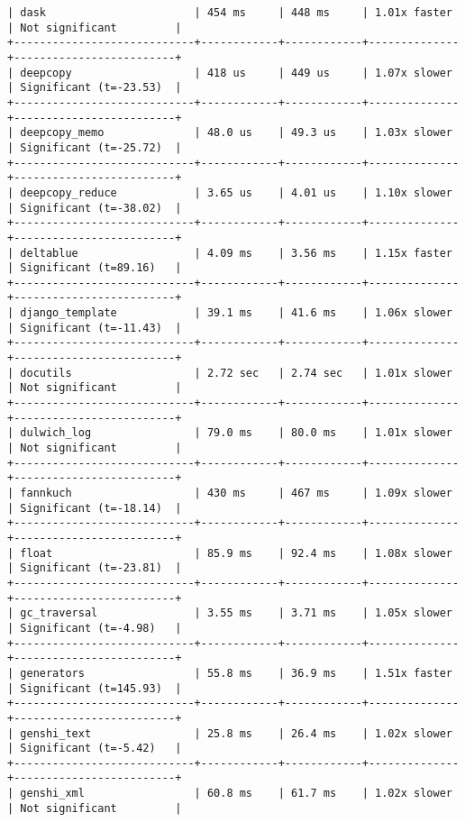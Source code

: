 \begin{code}
\begin{verbatim}
| dask                       | 454 ms     | 448 ms     | 1.01x faster | Not significant         |
+----------------------------+------------+------------+--------------+-------------------------+
| deepcopy                   | 418 us     | 449 us     | 1.07x slower | Significant (t=-23.53)  |
+----------------------------+------------+------------+--------------+-------------------------+
| deepcopy_memo              | 48.0 us    | 49.3 us    | 1.03x slower | Significant (t=-25.72)  |
+----------------------------+------------+------------+--------------+-------------------------+
| deepcopy_reduce            | 3.65 us    | 4.01 us    | 1.10x slower | Significant (t=-38.02)  |
+----------------------------+------------+------------+--------------+-------------------------+
| deltablue                  | 4.09 ms    | 3.56 ms    | 1.15x faster | Significant (t=89.16)   |
+----------------------------+------------+------------+--------------+-------------------------+
| django_template            | 39.1 ms    | 41.6 ms    | 1.06x slower | Significant (t=-11.43)  |
+----------------------------+------------+------------+--------------+-------------------------+
| docutils                   | 2.72 sec   | 2.74 sec   | 1.01x slower | Not significant         |
+----------------------------+------------+------------+--------------+-------------------------+
| dulwich_log                | 79.0 ms    | 80.0 ms    | 1.01x slower | Not significant         |
+----------------------------+------------+------------+--------------+-------------------------+
| fannkuch                   | 430 ms     | 467 ms     | 1.09x slower | Significant (t=-18.14)  |
+----------------------------+------------+------------+--------------+-------------------------+
| float                      | 85.9 ms    | 92.4 ms    | 1.08x slower | Significant (t=-23.81)  |
+----------------------------+------------+------------+--------------+-------------------------+
| gc_traversal               | 3.55 ms    | 3.71 ms    | 1.05x slower | Significant (t=-4.98)   |
+----------------------------+------------+------------+--------------+-------------------------+
| generators                 | 55.8 ms    | 36.9 ms    | 1.51x faster | Significant (t=145.93)  |
+----------------------------+------------+------------+--------------+-------------------------+
| genshi_text                | 25.8 ms    | 26.4 ms    | 1.02x slower | Significant (t=-5.42)   |
+----------------------------+------------+------------+--------------+-------------------------+
| genshi_xml                 | 60.8 ms    | 61.7 ms    | 1.02x slower | Not significant         |

\end{verbatim}
\end{code}
